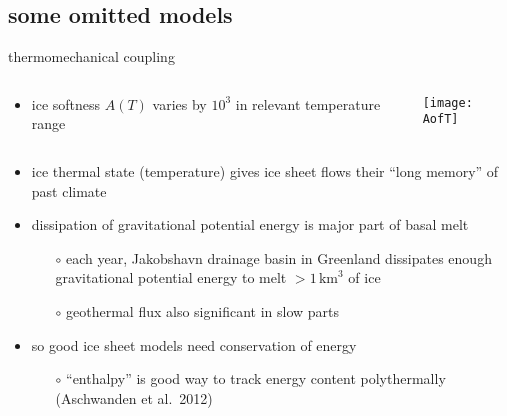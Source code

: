 \subsection{some omitted models}

\begin{frame}{thermomechanical coupling}

\begin{columns}
\begin{column}{0.5\textwidth}
\begin{itemize}
\item ice softness $A(T)$ varies by $10^3$ in relevant temperature range
\end{itemize}
\end{column}
\begin{column}{0.5\textwidth}
  \texttt{[image: AofT]}
\end{column}
\end{columns}

\begin{itemize}
\item ice thermal state (temperature) gives ice sheet flows their ``long memory'' of past climate
\item dissipation of gravitational potential energy is major part of basal melt
  \begin{itemize}
  \item[$\circ$] each year, Jakobshavn drainage basin in Greenland dissipates enough gravitational potential energy to melt $> 1\,\text{km}^3$ of ice
  \item[$\circ$] geothermal flux also significant in slow parts
  \end{itemize}
\item so good ice sheet models need conservation of energy
  \begin{itemize}
  \item[$\circ$] ``enthalpy'' is good way to track energy content polythermally (Aschwanden et al.~2012)\nocite{AschwandenBuelerKhroulevBlatter}
  \end{itemize}
\end{itemize}

\end{frame}


